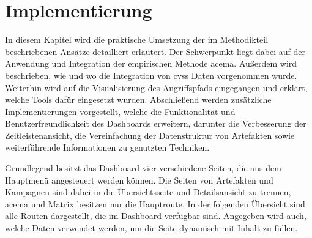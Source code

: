 \chapter{Implementierung}
\label{chap:implementierung}
In diesem Kapitel wird die praktische Umsetzung der im Methodikteil beschriebenen Ansätze detailliert erläutert. Der Schwerpunkt liegt dabei auf der Anwendung und Integration der empirischen Methode \gls{acema}. Außerdem wird beschrieben, wie und wo die Integration von \gls{cvss} Daten vorgenommen wurde. Weiterhin wird auf die Visualisierung des Angriffspfads eingegangen und erklärt, welche Tools dafür eingesetzt wurden. Abschließend werden zusätzliche Implementierungen vorgestellt, welche die Funktionalität und Benutzerfreundlichkeit des Dashboards erweitern, darunter die Verbesserung der Zeitleistenansicht, die Vereinfachung der Datenstruktur von Artefakten sowie weiterführende Informationen zu genutzten Techniken.
\par Grundlegend besitzt das Dashboard vier verschiedene Seiten, die aus dem Hauptmenü angesteuert werden können. Die Seiten von Artefakten und Kampagnen sind dabei in die Übersichtsseite und Detailsansicht zu trennen, \gls{acema} und Matrix besitzen nur die Hauptroute. In der folgenden Übersicht sind alle Routen dargestellt, die im Dashboard verfügbar sind. Angegeben wird auch, welche Daten verwendet werden, um die Seite dynamisch mit Inhalt zu füllen.

